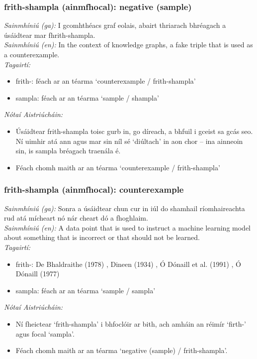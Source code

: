 \subsubsection*{frith-shampla (ainmfhocal): negative (sample)}
 \noindent \textit{Sainmhíniú (ga):} I gcomhthéacs graf eolais, abairt thriarach bhréagach a úsáidtear mar fhrith-shampla.
\\
 \noindent \textit{Sainmhíniú (en):} In the context of knowledge graphs, a fake triple that is used as a counterexample.
\\
 \noindent \textit{Tagairtí:}
\begin{itemize}
	\item frith-: féach ar an téarma `counterexample / frith-shampla'
	\item sampla: féach ar an téarma `sample / shampla'
\end{itemize}

 \noindent \textit{Nótaí Aistriúcháin:}
\begin{itemize}
	\item Úsáidtear frith-shampla toisc gurb in, go díreach, a bhfuil i gceist sa gcás seo. Ní uimhir atá ann agus mar sin níl sé `diúltach' in aon chor -- ina ainneoin sin, is sampla bréagach traenála é.
	\item Féach chomh maith ar an téarma `counterexample / frith-shampla'
\end{itemize}


\subsubsection*{frith-shampla (ainmfhocal): counterexample}
 \noindent \textit{Sainmhíniú (ga):} Sonra a úsáidtear chun cur in iúl do shamhail ríomhaireachta rud atá mícheart nó nár cheart dó a fhoghlaim.
\\
 \noindent \textit{Sainmhíniú (en):} A data point that is used to instruct a machine learning model about something that is incorrect or that should not be learned.
\\
 \noindent \textit{Tagairtí:}
\begin{itemize}
	\item frith-: De Bhaldraithe (1978) \cite{de-bhaldraithe}, Dineen (1934) \cite{dineen}, Ó Dónaill et al. (1991) \cite{focloir-beag}, Ó Dónaill (1977) \cite{odonaill}
	\item sampla: féach ar an téarma `sample / sampla'
\end{itemize}

 \noindent \textit{Nótaí Aistriúcháin:}
\begin{itemize}
	\item Ní fheictear `frith-shampla' i bhfoclóir ar bith, ach amháin an réimír `firth-' agus focal `sampla'.
	\item Féach chomh maith ar an téarma `negative (sample) / frith-shampla'.
\end{itemize}


